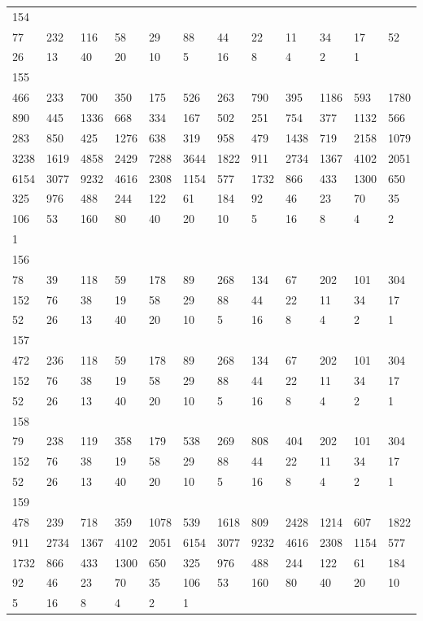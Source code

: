 \begin{longtable}{llllllllllll}
154&&&&&&&&&&&\\
77& 232& 116& 58& 29& 88& 44& 22& 11& 34& 17& 52\\
26& 13& 40& 20& 10& 5& 16& 8& 4& 2& 1& \\

155&&&&&&&&&&&\\
466& 233& 700& 350& 175& 526& 263& 790& 395& 1186& 593& 1780\\
890& 445& 1336& 668& 334& 167& 502& 251& 754& 377& 1132& 566\\
283& 850& 425& 1276& 638& 319& 958& 479& 1438& 719& 2158& 1079\\
3238& 1619& 4858& 2429& 7288& 3644& 1822& 911& 2734& 1367& 4102& 2051\\
6154& 3077& 9232& 4616& 2308& 1154& 577& 1732& 866& 433& 1300& 650\\
325& 976& 488& 244& 122& 61& 184& 92& 46& 23& 70& 35\\
106& 53& 160& 80& 40& 20& 10& 5& 16& 8& 4& 2\\
1& \\

156&&&&&&&&&&&\\
78& 39& 118& 59& 178& 89& 268& 134& 67& 202& 101& 304\\
152& 76& 38& 19& 58& 29& 88& 44& 22& 11& 34& 17\\
52& 26& 13& 40& 20& 10& 5& 16& 8& 4& 2& 1\\

157&&&&&&&&&&&\\
472& 236& 118& 59& 178& 89& 268& 134& 67& 202& 101& 304\\
152& 76& 38& 19& 58& 29& 88& 44& 22& 11& 34& 17\\
52& 26& 13& 40& 20& 10& 5& 16& 8& 4& 2& 1\\

158&&&&&&&&&&&\\
79& 238& 119& 358& 179& 538& 269& 808& 404& 202& 101& 304\\
152& 76& 38& 19& 58& 29& 88& 44& 22& 11& 34& 17\\
52& 26& 13& 40& 20& 10& 5& 16& 8& 4& 2& 1\\

159&&&&&&&&&&&\\
478& 239& 718& 359& 1078& 539& 1618& 809& 2428& 1214& 607& 1822\\
911& 2734& 1367& 4102& 2051& 6154& 3077& 9232& 4616& 2308& 1154& 577\\
1732& 866& 433& 1300& 650& 325& 976& 488& 244& 122& 61& 184\\
92& 46& 23& 70& 35& 106& 53& 160& 80& 40& 20& 10\\
5& 16& 8& 4& 2& 1& \\


\end{longtable}
